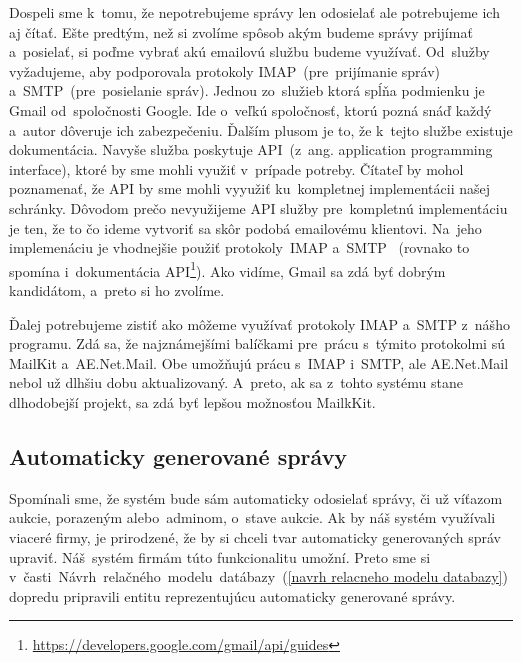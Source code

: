 Dospeli sme k~tomu, že nepotrebujeme správy len odosielať ale potrebujeme ich aj čítať. Ešte predtým, než si zvolíme spôsob akým budeme správy prijímať a~posielať, si poďme vybrať akú emailovú službu budeme využívať. Od~služby vyžadujeme, aby podporovala protokoly IMAP~(pre~prijímanie správ) a~SMTP~(pre~posielanie správ). Jednou zo~služieb ktorá spĺňa podmienku je Gmail od~spoločnosti Google. Ide o~veľkú spoločnosť, ktorú pozná snáď každý a~autor dôveruje ich zabezpečeniu. Ďalším plusom je to, že k~tejto službe existuje dokumentácia. Navyše služba poskytuje API~(z~ang. application programming interface), ktoré by sme mohli využiť v~prípade potreby. Čítateľ by mohol poznamenať, že API by sme mohli vyyužiť ku~kompletnej implementácii našej schránky. Dôvodom prečo nevyužijeme API služby pre~kompletnú implementáciu je ten, že to čo ideme vytvoriť sa skôr podobá emailovému klientovi. Na~jeho implemenáciu je vhodnejšie použiť protokoly~IMAP a~SMTP ~(rovnako to spomína i~dokumentácia API\footnote{\url{https://developers.google.com/gmail/api/guides}}). Ako vidíme, Gmail sa zdá byť dobrým kandidátom, a~preto si ho zvolíme.

Ďalej potrebujeme zistiť ako môžeme využívať protokoly IMAP a~SMTP z~nášho programu. Zdá sa, že najznámejšími balíčkami pre~prácu s~týmito protokolmi sú MailKit a~AE.Net.Mail. Obe umožňujú prácu s~IMAP i~SMTP, ale AE.Net.Mail nebol už dlhšiu dobu aktualizovaný. A~preto, ak sa z~tohto systému stane dlhodobejší projekt, sa zdá byť lepšou možnosťou MailkKit.

\subsection{Automaticky generované správy}

Spomínali sme, že systém bude sám automaticky odosielať správy, či už víťazom aukcie, porazeným alebo~adminom, o~stave aukcie. Ak by náš systém využívali viaceré firmy, je prirodzené, že by si chceli tvar automaticky generovaných správ upraviť. Náš~systém firmám túto funkcionalitu umožní. Preto sme si v~časti~Návrh~relačného~modelu~datábazy~(\ref{navrh relacneho modelu databazy}) dopredu pripravili entitu reprezentujúcu automaticky generované správy.


